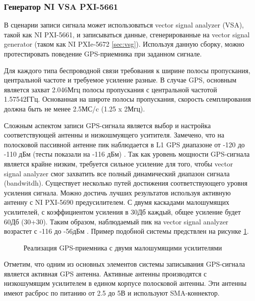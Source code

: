 \subsubsection{Генератор NI VSA PXI-5661}
В сценарии записи сигнала может использоваться vector signal analyzer (VSA), такой как NI PXI-5661, и записываться данные,
сгенерированные на vector signal generator (таком как NI PXIe-5672 \ref{sec:vsg}). Используя данную сборку, можно
протестировать поведение GPS-приемника при заданном сигнале.

Для каждого типа беспроводной связи требования к ширине полосы пропускания, центральной частоте и требуемое усиление разные.
В случае GPS, основным является захват 2.046Мгц полосы пропускания с центральной частотой 1.57542ГГц. Основанная на
широте полосы пропускания, скорость семплирования должна быть не менее 2.5МС/c (1.25 x 2Мгц). 

Сложным аспектом записи GPS-сигнала является выбор и настройка соответствующей антенны и низкошмуящего уситителя.
Замечено, что на полосковой пассивной антенне пик наблюдается в L1 GPS диапазоне от -120 до -110 дБм
(тесты показали на -116 дБм) \cite{ni_article}. Так как уровень
мощности GPS-сигнала является крайне низким, требуется сильное усиление для того, чтобы vector signal
analyzer смог захватить все полный динамический диапазон сигнала (bandwitdh). Существует несколько путей достижения
соответствующего уровня усиления сигнала. Можно достичь лучших результатов используя активную антенну с NI PXI-5690
предусилителем. С двумя каскадами малошумящих усилителей, с коэффициентом усиления в 30Дб каждый, общее усиление будет
60Дб (30+30). Таким образом, наблюдаемый пик на vector signal analyzer возрастет с -116 до -56дБм \cite{ni_article}.
Пример подобной системы предствлен на рисунке \ref{pic:ni_gps_receiver}.

\begin{figure}[H]
\begin{center}
\end{center}
\caption{Реализация GPS-приемника с двумя малошумящими усилителями}
\label{pic:ni_gps_receiver}
\end{figure}

Отметим, что одним из основных элементов системы записывания GPS-сигнала является активная GPS антенна. Активные антенны
производятся с низкошумящим усилителем в едином корпусе полосковой антенны. Эти антенны имеют расброс по питанию от 2.5 до
5В и используют SMA-коннектор. 

